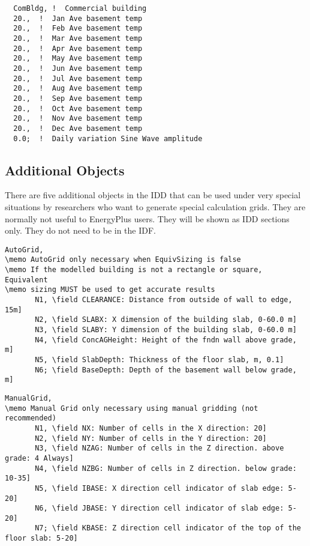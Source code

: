 \begin{lstlisting}
  ComBldg, !  Commercial building
  20.,  !  Jan Ave basement temp
  20.,  !  Feb Ave basement temp
  20.,  !  Mar Ave basement temp
  20.,  !  Apr Ave basement temp
  20.,  !  May Ave basement temp
  20.,  !  Jun Ave basement temp
  20.,  !  Jul Ave basement temp
  20.,  !  Aug Ave basement temp
  20.,  !  Sep Ave basement temp
  20.,  !  Oct Ave basement temp
  20.,  !  Nov Ave basement temp
  20.,  !  Dec Ave basement temp
  0.0;  !  Daily variation Sine Wave amplitude
\end{lstlisting}

\subsection{Additional Objects}\label{additional-objects}

There are five additional objects in the IDD that can be used under very special situations by researchers who want to generate special calculation grids. They are normally not useful to EnergyPlus users. They will be shown as IDD sections only. They do not need to be in the IDF.

\begin{lstlisting}
AutoGrid,
\memo AutoGrid only necessary when EquivSizing is false
\memo If the modelled building is not a rectangle or square, Equivalent
\memo sizing MUST be used to get accurate results
       N1, \field CLEARANCE: Distance from outside of wall to edge, 15m]
       N2, \field SLABX: X dimension of the building slab, 0-60.0 m]
       N3, \field SLABY: Y dimension of the building slab, 0-60.0 m]
       N4, \field ConcAGHeight: Height of the fndn wall above grade, m]
       N5, \field SlabDepth: Thickness of the floor slab, m, 0.1]
       N6; \field BaseDepth: Depth of the basement wall below grade, m]
\end{lstlisting}

\begin{lstlisting}
ManualGrid,
\memo Manual Grid only necessary using manual gridding (not recommended)
       N1, \field NX: Number of cells in the X direction: 20]
       N2, \field NY: Number of cells in the Y direction: 20]
       N3, \field NZAG: Number of cells in the Z direction. above grade: 4 Always]
       N4, \field NZBG: Number of cells in Z direction. below grade: 10-35]
       N5, \field IBASE: X direction cell indicator of slab edge: 5-20]
       N6, \field JBASE: Y direction cell indicator of slab edge: 5-20]
       N7; \field KBASE: Z direction cell indicator of the top of the floor slab: 5-20]
\end{lstlisting}

